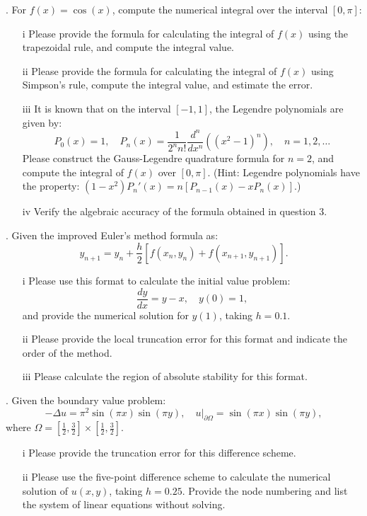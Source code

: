 \documentclass[a4paper]{ctexart}
\begin{document}
. For \( f(x) = \cos(x) \), 
compute the numerical integral over the interval \([0, \pi]\):
\begin{enumerate}
    \item[i] Please provide the formula for calculating the integral 
    of \( f(x) \) using the trapezoidal rule, 
    and compute the integral value.
    \item[ii] Please provide the formula for calculating the integral 
    of \( f(x) \) using Simpson's rule, 
    compute the integral value, and estimate the error.
    \item[iii] It is known that on the interval \([-1, 1]\), 
    the Legendre polynomials are given by:
    \[
       P_0(x) = 1, 
       \quad P_n(x) = \frac{1}{2^n n!} \frac{d^n}{dx^n} \left( (x^2 - 1)^n \right), 
       \quad n = 1, 2, \ldots
    \]
    Please construct the Gauss-Legendre quadrature formula for \( n = 2 \), 
    and compute the integral of \( f(x) \) over \([0, \pi]\). 
    (Hint: Legendre polynomials have the property: \((1 - x^2) P_n'(x) = n[P_{n-1}(x) - xP_n(x)]\).)
    \item[iv] Verify the algebraic accuracy of the formula obtained in question 3.
\end{enumerate}

. Given the improved Euler's method formula as:
\[
y_{n+1} = y_n + \frac{h}{2} [f(x_n, y_n) + f(x_{n+1}, y_{n+1})].
\]
\begin{enumerate}
    \item[i] Please use this format to calculate the initial value problem:
    \[
    \frac{dy}{dx} = y - x, \quad y(0) = 1,
    \]
    and provide the numerical solution for \( y(1) \), taking \( h = 0.1 \).
    \item[ii] Please provide the local truncation error 
    for this format and indicate the order of the method.
    \item[iii] Please calculate the region of absolute stability for this format.
\end{enumerate}

. Given the boundary value problem:
\[
-\Delta u = \pi^2 \sin(\pi x) \sin(\pi y), 
\quad u|_{\partial \Omega} = \sin(\pi x) \sin(\pi y),
\]
where 
\( \Omega = \left[\frac{1}{2}, \frac{3}{2}\right] \times \left[\frac{1}{2}, 
\frac{3}{2}\right] \).
\begin{enumerate}
    \item[i] Please provide the truncation error for this difference scheme.
    \item[ii] Please use the five-point difference scheme 
    to calculate the numerical solution of \( u(x, y) \), taking \( h = 0.25 \). 
    Provide the node numbering and list the system 
    of linear equations without solving.
\end{enumerate}
\end{document}
